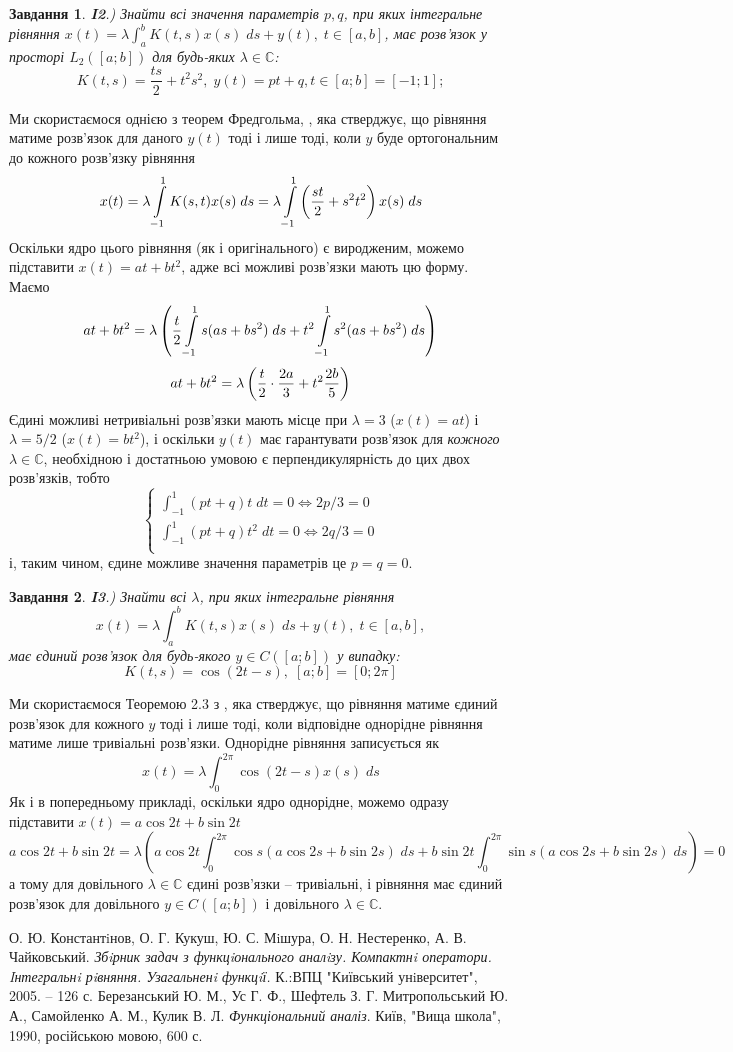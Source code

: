 \documentclass[12pt]{article} %
\newtheorem{prob}{Завдання}
\newcommand{\ds}{\;ds}
\newcommand{\dt}{\;dt}
\begin{document}
\begin{prob}{\bf I2}.{)} Знайти всі значення параметрів $p,q$, при яких інтегральне рівняння 
	$x(t)=\lambda\int_a^bK(t,s)x(s)\ds+y(t),\;t\in[a,b]$,
	має розв’язок у просторі $L_2([a;b])$ для будь-яких $\lambda\in\mathbb{C}$:
	\[K(t,s)=\frac{ts}{2}+t^2s^2,\;y(t)=pt+q,t\in[a;b]=[-1;1];\]
\end{prob}
Ми скористаємося однією з теорем Фредгольма, \cite[Теорема 2.1, \S2, Глава IX]{tb}, яка стверджує, що рівняння матиме розв’язок для
даного $y(t)$ тоді і лише тоді, коли $y$ буде ортогональним до кожного розв’язку рівняння
\[x(t)=\lambda\int_{-1}^1K(s,t)x(s)\ds=\lambda\int_{-1}^1\mybra{\frac{st}{2}+s^2t^2}x(s)\ds\]
Оскільки ядро цього рівняння (як і оригінального) є виродженим, можемо підставити $x(t)=at+bt^2$, адже всі можливі розв’язки мають цю форму. Маємо
\[at+bt^2=\lambda\mybra{\frac{t}{2}\int_{-1}^1s(as+bs^2)\ds+t^2\int_{-1}^1s^2(as+bs^2)\ds}\]
\[at+bt^2=\lambda\left(\frac{t}{2}\cdot\frac{2a}{3}+t^2\frac{2b}{5}\right)\]
Єдині можливі нетривіальні розв’язки мають місце при $\lambda=3$ ($x(t)=at$) і $\lambda=5/2$ ($x(t)=bt^2$), і оскільки $y(t)$ має гарантувати
розв’язок для \textit{кожного} $\lambda\in\mathbb{C}$, необхідною і достатньою умовою є перпендикулярність до цих двох розв’язків, тобто
\[\begin{cases}
\int_{-1}^1(pt+q)t\dt=0\iff 2p/3=0\\
\int_{-1}^1(pt+q)t^2\dt=0\iff 2q/3=0\\
\end{cases}\]
і, таким чином, єдине можливе значення параметрів це $p=q=0$.

\begin{prob}{\bf I3}.{)} Знайти всі $\lambda$, при яких інтегральне рівняння
	\[x(t)=\lambda\int_a^bK(t,s)x(s)\ds+y(t),\;t\in[a,b],\]
	має єдиний розв’язок для будь-якого $y\in C([a;b])$ у випадку:
	\[K(t,s)=\cos(2t-s),\;[a;b]=[0;2\pi]\]
\end{prob}
Ми скористаємося Теоремою 2.3 з \cite[\S2, Глава IX]{tb}, яка стверджує, що рівняння матиме єдиний розв’язок для кожного $y$ тоді і лише тоді,
коли відповідне однорідне рівняння матиме лише тривіальні розв’язки. Однорідне рівняння записується як
\[x(t)=\lambda\int_0^{2\pi}\cos(2t-s)x(s)\ds\]
Як і в попередньому прикладі, оскільки ядро однорідне, можемо одразу підставити $x(t)=a\cos2t+b\sin2t$
\[a\cos2t+b\sin2t=\lambda(a\cos2t\int_0^{2\pi}\cos s(a\cos2s+b\sin2s)\ds+b\sin2t\int_0^{2\pi}\sin s(a\cos2s+b\sin2s)\ds)=0\]
а тому для довільного $\lambda\in\mathbb{C}$ єдині розв’язки -- тривіальні, і рівняння має єдиний розв’язок для довільного $y\in C([a;b])$
і довільного $\lambda\in\mathbb{C}$.
\begin{thebibliography}{9}
	О. Ю. Константiнов,
	О. Г. Кукуш, Ю. С. Мiшура, О. Н. Нестеренко, А. В. Чайковський. \emph{Збiрник задач з функцiонального аналiзу. Компактнi оператори. 
	Iнтегральнi рiвняння. Узагальненi функцiї.}
	К.:ВПЦ "Київський унiверситет", 2005. -- 126 с.
	Березанський Ю. М., Ус Г. Ф., Шефтель З. Г.
	Митропольський Ю. А., Самойленко А. М., Кулик В. Л.
	\emph{Функціональний аналіз}.
	Київ, "Вища школа"{}, 1990, російською мовою, 600 с.
\end{thebibliography}
\end{document}
